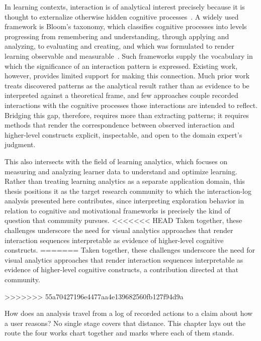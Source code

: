 In learning contexts, interaction is of analytical interest precisely because it is thought to externalize otherwise hidden cognitive processes~\cite{bogarin2018survey}.
A widely used framework is Bloom's taxonomy, which classifies cognitive processes into levels progressing from remembering and understanding, through applying and analyzing, to evaluating and creating, and which was formulated to render learning observable and measurable~\cite{bloom1956taxonomy, anderson2001taxonomy}.
Such frameworks supply the vocabulary in which the significance of an interaction pattern is expressed.
Existing work, however, provides limited support for making this connection.
Much prior work treats discovered patterns as the analytical result rather than as evidence to be interpreted against a theoretical frame, and few approaches couple recorded interactions with the cognitive processes those interactions are intended to reflect.
Bridging this gap, therefore, requires more than extracting patterns; it requires methods that render the correspondence between observed interaction and higher-level constructs explicit, inspectable, and open to the domain expert's judgment.

This also intersects with the field of learning analytics, which focuses on measuring and analyzing learner data to understand and optimize learning.
Rather than treating learning analytics as a separate application domain, this thesis positions it as the target research community to which the interaction-log analysis presented here contributes, since interpreting exploration behavior in relation to cognitive and motivational frameworks is precisely the kind of question that community pursues.
<<<<<<< HEAD
Taken together, these challenges underscore the need for visual analytics approaches that render interaction sequences interpretable as evidence of higher-level cognitive constructs.
=======
Taken together, these challenges underscore the need for visual analytics approaches that render interaction sequences interpretable as evidence of higher-level cognitive constructs, a contribution directed at that community.

>>>>>>> 55a70427196e4477aa4e139682560fb127f94d9a



\label{cha:synopsis}

How does an analysis travel from a log of recorded actions to a claim about how a user reasons?
No single stage covers that distance.
This chapter lays out the route the four works chart together and marks where each of them stands.

